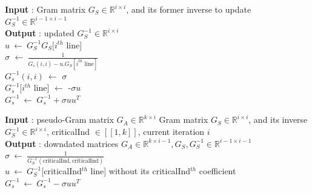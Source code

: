 \documentclass{ipol}
\newcommand{\dsize}{k}
\begin{document}
\newpage

\begin{algorithm}[H]

\SetLine
\textbf{Input} : Gram matrix $G_S \in \mathbb{R}^{i \times i}$, and its former inverse to update $G_S^{-1}\in \mathbb{R}^{i-1 \times i-1}$\\
\textbf{Output} : updated  $G_S^{-1}\in \mathbb{R}^{i \times i}$\\
$u \ \leftarrow \ G_S^{-1} G_S[i^{th}$ line]\\
$\sigma$ $\leftarrow \ \frac{1}{G_s(i,i) - u.G_S[i^{th} \text{ line}]}$\\
$G_s^{-1}(i,i)\ \leftarrow$ $\sigma$\\
$G_s^{-1}[i^{th}$ line] $\leftarrow$ -$\sigma u$\\
\Return $G_s^{-1} \ \leftarrow \ G_s^{-1}+\sigma u u^T$\\
\caption{\textit{updateGram} {\color{blue} Marc: Algo correspondant, mais \`a valider.}}

\end{algorithm}

\begin{algorithm}[H]

\SetLine
\textbf{Input} : pseudo-Gram matrix $G_A \in \mathbb{R}^{\dsize \times i}$
Gram matrix $G_S \in \mathbb{R}^{i \times i}$, and its 
inverse $G_S^{-1}\in \mathbb{R}^{i \times i}$, criticalInd $\in [\![1, \dsize]\!]$, current iteration $i$\\
\textbf{Output} : downdated matrices $G_A \in \mathbb{R}^{\dsize \times i-1}, G_S, G_S^{-1} \in \mathbb{R}^{i-1 \times i-1}$\\

$\sigma \ \leftarrow \ \frac{1}{G_S^{-1}(\text{criticalInd}, \text{criticalInd})}$\\
$u \ \leftarrow \ G_S^{-1} [$criticalInd$^{th}$ line] without its criticalInd$^{th}$ coefficient\\
$G_s^{-1} \ \leftarrow \ G_s^{-1}-\sigma u u^T$\\

\caption{\textit{downdateGram} {\color{blue} Marc: Algo correspondant, mais \`a valider.}}

\end{algorithm}
\end{document}
